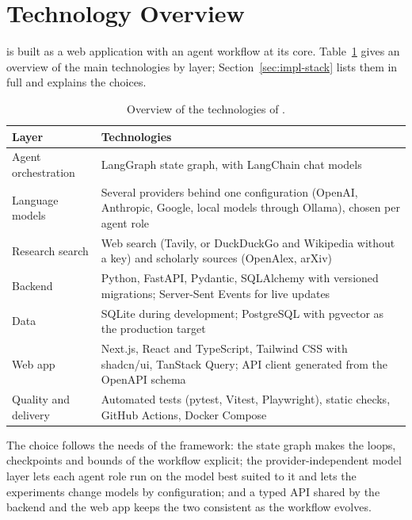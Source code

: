 \section{Technology Overview}
\label{sec:intro-technology}

\sysname{} is built as a web application with an agent workflow at its core. Table~\ref{tab:intro-tech} gives an overview of the main technologies by layer; Section~\ref{sec:impl-stack} lists them in full and explains the choices.

\begin{table}[H]
    \centering
    \caption{Overview of the technologies of \sysname{}.}
    \label{tab:intro-tech}
    \begin{tabularx}{\linewidth}{|p{3.4cm}|X|}
        \hline
        \textbf{Layer} & \textbf{Technologies} \\
        \hline
        Agent orchestration & LangGraph state graph, with LangChain chat models \\
        Language models & Several providers behind one configuration (OpenAI, Anthropic, Google, local models through Ollama), chosen per agent role \\
        Research search & Web search (Tavily, or DuckDuckGo and Wikipedia without a key) and scholarly sources (OpenAlex, arXiv) \\
        Backend & Python, FastAPI, Pydantic, SQLAlchemy with versioned migrations; Server-Sent Events for live updates \\
        Data & SQLite during development; PostgreSQL with pgvector as the production target \\
        Web app & Next.js, React and TypeScript, Tailwind CSS with shadcn/ui, TanStack Query; API client generated from the OpenAPI schema \\
        Quality and delivery & Automated tests (pytest, Vitest, Playwright), static checks, GitHub Actions, Docker Compose \\
        \hline
    \end{tabularx}
\end{table}

The choice follows the needs of the framework: the state graph makes the loops, checkpoints and bounds of the workflow explicit; the provider-independent model layer lets each agent role run on the model best suited to it and lets the experiments change models by configuration; and a typed API shared by the backend and the web app keeps the two consistent as the workflow evolves.
